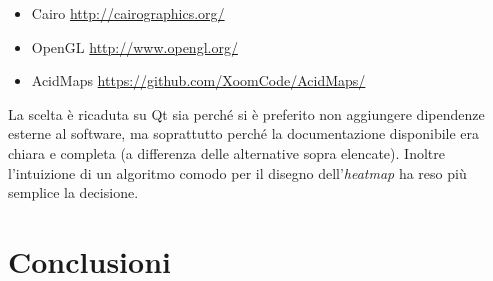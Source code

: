 \documentclass[a4paper,13pt,twoside]{article}
\begin{document}
\begin{itemize}
	\item Cairo \url{http://cairographics.org/}
	\item OpenGL \url{http://www.opengl.org/}
	\item AcidMaps \url{https://github.com/XoomCode/AcidMaps/}
\end{itemize}
La scelta è ricaduta su Qt sia perché si è preferito non aggiungere dipendenze esterne al software, ma soprattutto perché la documentazione disponibile era chiara e completa (a differenza delle alternative sopra elencate). Inoltre l'intuizione di un algoritmo comodo per il disegno dell'\textit{heatmap} ha reso più semplice la decisione. \\


\newpage
\section{Conclusioni}
\newpage

%
%


%

\appendix
%
%
%
\end{document}
